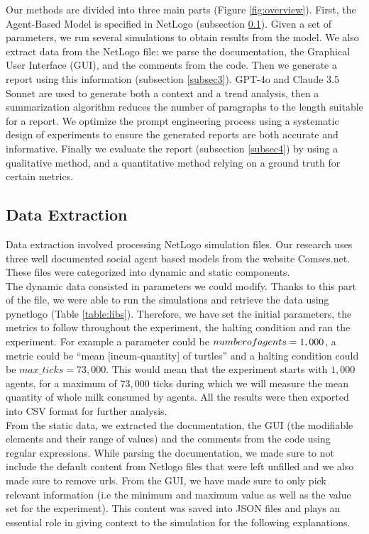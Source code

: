 \documentclass[preprint,12pt]{elsarticle}
\begin{document}
Our methods are divided into three main parts (Figure \ref{fig:overview}). First, the Agent-Based Model is specified in NetLogo (subsection \ref{subsec2}). Given a set of parameters, we run several simulations to obtain results from the model. We also extract data from the NetLogo file: we parse the documentation, the Graphical User Interface (GUI), and the comments from the code. Then we generate a report using this information (subsection \ref{subsec3}). GPT-4o and Claude 3.5 Sonnet are used to generate both a context and a trend analysis, then a summarization algorithm reduces the number of paragraphs to the length suitable for a report. We optimize the prompt engineering process using a systematic design of experiments to ensure the generated reports are both accurate and informative. Finally we evaluate the report (subsection \ref{subsec4}) by using a qualitative method, and a quantitative method relying on a ground truth for certain metrics.


\subsection{Data Extraction}
\label{subsec2}


Data extraction involved processing NetLogo simulation files. Our research uses three well documented social agent based models from the website Comses.net. These files were categorized into dynamic and static components.\\

The dynamic data consisted in parameters we could modify. Thanks to this part of the file, we were able to run the simulations and retrieve the data using pynetlogo (Table \ref{table:libs}). Therefore, we have set the initial parameters, the metrics to follow throughout the experiment, the halting condition and ran the experiment. For example a parameter could be $number\-of\-agents = 1,000$, a metric could be “mean [incum-quantity] of turtles” and a halting condition could be $max\_ticks =73,000$. This would mean that the experiment starts with $1,000$ agents, for a maximum of $73,000$ ticks during which we will measure the mean quantity of whole milk consumed by agents. All the results were then exported into CSV format for further analysis.\\

From the static data, we extracted the documentation, the GUI (the modifiable elements and their range of values) and the comments from the code using regular expressions. While parsing the documentation, we made sure to not include the default content from Netlogo files that were left unfilled and we also made sure to remove urls. From the GUI, we have made sure to only pick relevant information (i.e the minimum and maximum value as well as the value set for the experiment). This content was saved into JSON files and plays an essential role in giving context to the simulation for the following explanations.
\end{document}
